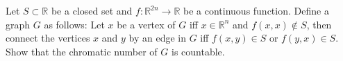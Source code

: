 Let $S\subset \mathbb{R}$ be a closed set and $f:\mathbb{R}^{2n}\to \mathbb{R}$ be a continuous function. Define a graph $G$ as follows: Let $x$ be a vertex of $G$ iff $x\in \mathbb{R}^{n}$ and $f(x,x)\not\in S$, then connect the vertices $x$ and $y$ by an edge in $G$ iff $f(x,y)\in S$ or $f(y,x)\in S$. Show that the chromatic number of $G$ is countable.